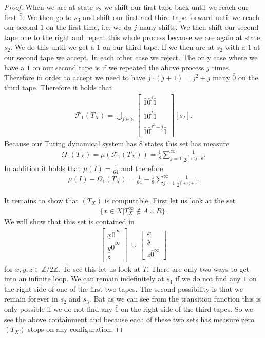 \documentclass[12pt,a4paper]{scrartcl}
\theoremstyle{plain}
\theoremstyle{definition}
\numberwithin{equation}{section}
\newcommand{\N}{\mathbb{N}} %
\newcommand{\2}{\mathbb{Z} / 2 \mathbb{Z}}
\newcommand{\1}{\bar{1}}
\newcommand{\0}{\bar{0}}
\begin{document}
\begin{proof}
When we are at state $s_2$ we shift our first tape back until we reach our first $\1$. We then go to $s_3$ and shift our first and third tape forward until we reach our second $\1$ on the first time, i.e. we do $j$-many shifts. We then shift our second tape one to the right and repeat this whole process because we are again at state $s_2$. We do this until we get a $\1$ on our third tape. If we then are at $s_2$ with a $\1$ at our second tape we accept. In each other case we reject. The only case where we have a $\1$ on our second tape is if we repeated the above process $j$ times. Therefore in order to accept we need to have $j \cdot (j + 1) = j^2 + j$  many $\0$ on the third tape. Therefore it holds that
\begin{align*}
	\mathcal{F}_1(T_X) = \bigcup_{j \in \N}\begin{bmatrix}
	 	\underline{\1} \0^j \1 \\
	 	\underline{\1} \0^j \1 \\
	 	\underline{\1} \0^{j^2 + j} \1
	\end{bmatrix}[s_I].
\end{align*}
Because our Turing dynamical system  has $8$ states this set has measure 
\begin{align*}
	\Omega_1(T_X) = \mu(\mathcal{F}_1(T_X)) = \frac{1}{8} \sum_{j = 1}^{\infty} \frac{1}{2^{j^2 + 3j + 6}}.
\end{align*}
In addition it holds that $\mu (I) = \frac{1}{64}$ and therefore 
\begin{align*}
	\mu (I) - \Omega_1(T_X) = \frac{1}{64} - \frac{1}{8} \sum_{j = 1}^{\infty} \frac{1}{2^{j^2 + 3j + 6}}.
\end{align*}

It remains to show that $(T_X)$ is computable. First let us look at the set 
\begin{align*}
	\{x \in X | T_X^\infty \notin A \cup R\}.
\end{align*}
We will show that this set is contained in
\begin{align*}
	\begin{bmatrix}
		\underline{x} \0^\infty \\
		\underline{y} \0^\infty \\
		\underline{z}
	\end{bmatrix} \  \cup \
	\begin{bmatrix}
		\underline{x} \\
		\underline{y} \\
		\underline{z} \0^\infty
	\end{bmatrix}
\end{align*} for $x, y, z \in \2$.
To see this let us look at $T$. There are only two ways to get into an infinite loop. We can remain indefinitely at $s_1$ if we do not find any $\1$ on the right side of one of the first two tapes. The second possibility is that we remain forever in $s_2$ and $s_3$. Bat as we can see from the transition function this is only possible if we do not find any $\1$ on the  right side of the third tapes. So we see the above containment and because each of these two sets has measure zero $(T_X)$ stops on any configuration. 


\end{proof}
\end{document}
